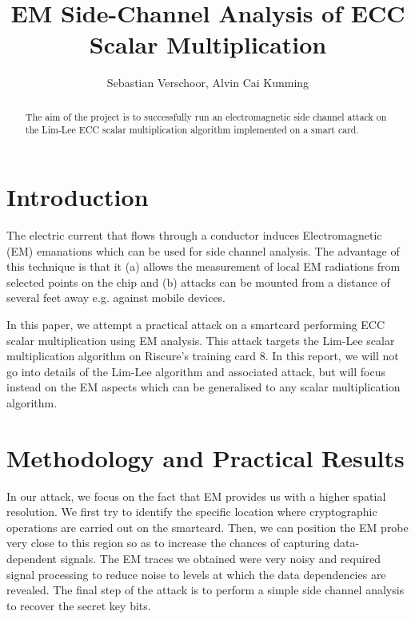 \documentclass{llncs}
\begin{document}
\title{EM Side-Channel Analysis of ECC Scalar Multiplication}
\author{Sebastian Verschoor, Alvin Cai Kunming}
\maketitle
%
\begin{abstract}
The aim of the project is to successfully run an electromagnetic side channel attack on the Lim-Lee ECC scalar multiplication algorithm implemented on a smart card. 
\end{abstract} 
%
\section{Introduction}

The electric current that flows through a conductor induces Electromagnetic (EM) emanations which can be used for side channel analysis. The advantage of this technique is that it (a) allows the measurement of local EM radiations from selected points on the chip \cite{gandolfi2001} and (b) attacks can be mounted from a distance of several feet away \cite{kenworthy2012} e.g. against mobile devices.

In this paper, we attempt a practical attack on a smartcard performing ECC scalar multiplication using EM analysis. This attack targets the Lim-Lee scalar multiplication algorithm on Riscure's training card 8. In this report, we will not go into details of the Lim-Lee algorithm and associated attack, but will focus instead on the EM aspects which can be generalised to any scalar multiplication algorithm.

\section{Methodology and Practical Results}

In our attack, we focus on the fact that EM provides us with a higher spatial resolution. We first try to identify the specific location where cryptographic operations are carried out on the smartcard. Then, we can position the EM probe very close to this region so as to increase the chances of capturing data-dependent signals. The EM traces we obtained were very noisy and required signal processing to reduce noise to levels at which the data dependencies are revealed. The final step of the attack is to perform a simple side channel analysis to recover the secret key bits.
\end{document}
